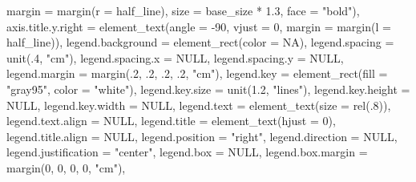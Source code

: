 \documentclass[
  letterpaper,
  DIV=11,
  numbers=noendperiod]{scrreprt}
\newenvironment{Shaded}{\begin{snugshade}}{\end{snugshade}}
\newcommand{\AttributeTok}[1]{\textcolor[rgb]{0.40,0.45,0.13}{#1}}
\newcommand{\ConstantTok}[1]{\textcolor[rgb]{0.56,0.35,0.01}{#1}}
\newcommand{\DecValTok}[1]{\textcolor[rgb]{0.68,0.00,0.00}{#1}}
\newcommand{\FloatTok}[1]{\textcolor[rgb]{0.68,0.00,0.00}{#1}}
\newcommand{\FunctionTok}[1]{\textcolor[rgb]{0.28,0.35,0.67}{#1}}
\newcommand{\NormalTok}[1]{\textcolor[rgb]{0.00,0.23,0.31}{#1}}
\newcommand{\SpecialCharTok}[1]{\textcolor[rgb]{0.37,0.37,0.37}{#1}}
\newcommand{\StringTok}[1]{\textcolor[rgb]{0.13,0.47,0.30}{#1}}
\begin{document}
\begin{Shaded}
\begin{Highlighting}[]
                                \AttributeTok{margin =} \FunctionTok{margin}\NormalTok{(}\AttributeTok{r =}\NormalTok{ half\_line),}
                                \AttributeTok{size =}\NormalTok{ base\_size }\SpecialCharTok{*} \FloatTok{1.3}\NormalTok{, }\AttributeTok{face =} \StringTok{"bold"}\NormalTok{),}
    \AttributeTok{axis.title.y.right =} \FunctionTok{element\_text}\NormalTok{(}\AttributeTok{angle =} \SpecialCharTok{{-}}\DecValTok{90}\NormalTok{, }\AttributeTok{vjust =} \DecValTok{0}\NormalTok{,}
                                      \AttributeTok{margin =} \FunctionTok{margin}\NormalTok{(}\AttributeTok{l =}\NormalTok{ half\_line)),}
    \AttributeTok{legend.background =} \FunctionTok{element\_rect}\NormalTok{(}\AttributeTok{color =} \ConstantTok{NA}\NormalTok{),}
    \AttributeTok{legend.spacing =} \FunctionTok{unit}\NormalTok{(.}\DecValTok{4}\NormalTok{, }\StringTok{"cm"}\NormalTok{),}
    \AttributeTok{legend.spacing.x =} \ConstantTok{NULL}\NormalTok{,}
    \AttributeTok{legend.spacing.y =} \ConstantTok{NULL}\NormalTok{,}
    \AttributeTok{legend.margin =} \FunctionTok{margin}\NormalTok{(.}\DecValTok{2}\NormalTok{, .}\DecValTok{2}\NormalTok{, .}\DecValTok{2}\NormalTok{, .}\DecValTok{2}\NormalTok{, }\StringTok{"cm"}\NormalTok{),}
    \AttributeTok{legend.key =} \FunctionTok{element\_rect}\NormalTok{(}\AttributeTok{fill =} \StringTok{"gray95"}\NormalTok{, }\AttributeTok{color =} \StringTok{"white"}\NormalTok{),}
    \AttributeTok{legend.key.size =} \FunctionTok{unit}\NormalTok{(}\FloatTok{1.2}\NormalTok{, }\StringTok{"lines"}\NormalTok{),}
    \AttributeTok{legend.key.height =} \ConstantTok{NULL}\NormalTok{,}
    \AttributeTok{legend.key.width =} \ConstantTok{NULL}\NormalTok{,}
    \AttributeTok{legend.text =} \FunctionTok{element\_text}\NormalTok{(}\AttributeTok{size =} \FunctionTok{rel}\NormalTok{(.}\DecValTok{8}\NormalTok{)),}
    \AttributeTok{legend.text.align =} \ConstantTok{NULL}\NormalTok{,}
    \AttributeTok{legend.title =} \FunctionTok{element\_text}\NormalTok{(}\AttributeTok{hjust =} \DecValTok{0}\NormalTok{),}
    \AttributeTok{legend.title.align =} \ConstantTok{NULL}\NormalTok{,}
    \AttributeTok{legend.position =} \StringTok{"right"}\NormalTok{,}
    \AttributeTok{legend.direction =} \ConstantTok{NULL}\NormalTok{,}
    \AttributeTok{legend.justification =} \StringTok{"center"}\NormalTok{,}
    \AttributeTok{legend.box =} \ConstantTok{NULL}\NormalTok{,}
    \AttributeTok{legend.box.margin =} \FunctionTok{margin}\NormalTok{(}\DecValTok{0}\NormalTok{, }\DecValTok{0}\NormalTok{, }\DecValTok{0}\NormalTok{, }\DecValTok{0}\NormalTok{, }\StringTok{"cm"}\NormalTok{),}

\end{Highlighting}
\end{Shaded}
\end{document}
